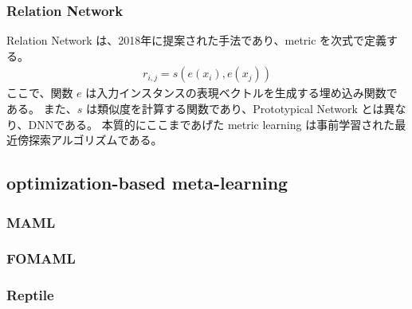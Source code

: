 \documentclass{jsarticle}
\begin{document}
\subsubsection{Relation Network}
Relation Network は、2018年に提案された手法であり、metric を次式で定義する。
\begin{eqnarray}
  \label{RN}
  r_{i,j} = s(e(x_i),e(x_j))
\end{eqnarray}
ここで、関数 $e$ は入力インスタンスの表現ベクトルを生成する埋め込み関数である。
また、$s$ は類似度を計算する関数であり、Prototypical Network とは異なり、DNNである。
本質的にここまであげた metric learning は事前学習された最近傍探索アルゴリズムである。

\subsection{optimization-based meta-learning}
\subsubsection{MAML}

\subsubsection{FOMAML}

\subsubsection{Reptile}



\end{document}
